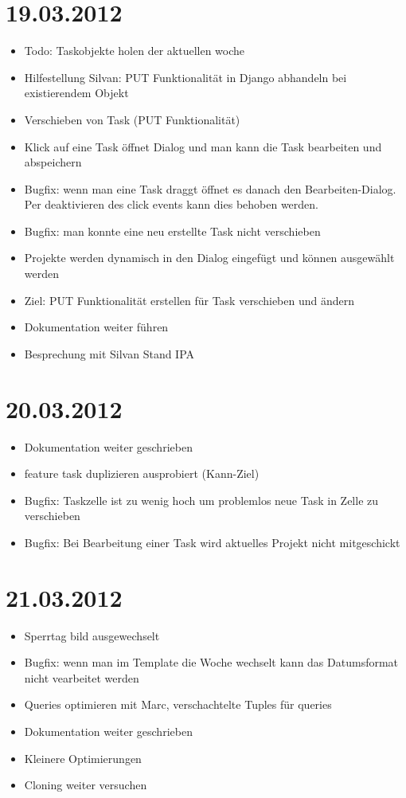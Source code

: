 \section{19.03.2012}
    \begin{itemize}
        \item Todo: Taskobjekte holen der aktuellen woche
        \item Hilfestellung Silvan: PUT Funktionalität in Django abhandeln bei existierendem Objekt
        \item Verschieben von Task (PUT Funktionalität)
        \item Klick auf eine Task öffnet Dialog und man kann die Task bearbeiten und abspeichern
        \item Bugfix: wenn man eine Task draggt öffnet es danach den Bearbeiten-Dialog. Per deaktivieren des click events kann dies behoben werden.
        \item Bugfix: man konnte eine neu erstellte Task nicht verschieben
        \item Projekte werden dynamisch in den Dialog eingefügt und können ausgewählt werden
        \item Ziel: PUT Funktionalität erstellen für Task verschieben und ändern
        \item Dokumentation weiter führen
        \item Besprechung mit Silvan Stand IPA
    \end{itemize}
\section{20.03.2012}
    \begin{itemize}
        \item Dokumentation weiter geschrieben
        \item feature task duplizieren ausprobiert (Kann-Ziel)
        \item Bugfix: Taskzelle ist zu wenig hoch um problemlos neue Task in Zelle zu verschieben
        \item Bugfix: Bei Bearbeitung einer Task wird aktuelles Projekt nicht mitgeschickt
    \end{itemize}
\section{21.03.2012}
    \begin{itemize}
        \item Sperrtag bild ausgewechselt
        \item Bugfix: wenn man im Template die Woche wechselt kann das Datumsformat nicht vearbeitet werden
        \item Queries optimieren mit Marc, verschachtelte Tuples für queries
        \item Dokumentation weiter geschrieben
        \item Kleinere Optimierungen
        \item Cloning weiter versuchen
    \end{itemize}
